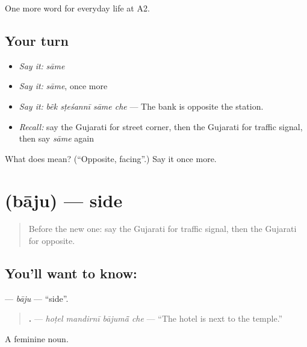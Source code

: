 \begin{grammarlens}[title={What you've built}]
One more word for everyday life at A2.
\end{grammarlens}

\subsection*{Your turn}
\begin{itemize}
\raggedright
  \item \emph{Say it:} \emph{sāme}
  \item \emph{Say it:} \emph{sāme}, once more
  \item \emph{Say it:} \emph{bẽk sṭeśannī sāme che} — The bank is opposite the station.
  \item \emph{Recall:} say the Gujarati for street corner, then the Gujarati for traffic signal, then say \emph{sāme} again
\end{itemize}

\begin{tcolorbox}[breakable,colback=teal!4,colframe=teal!35!black,title={Before you move on}]
What does  mean? (\textquotedblleft{}Opposite, facing\textquotedblright{}.) Say it once more.
\end{tcolorbox}
\section[\texorpdfstring{\gu{બાજુ} (bāju)}{બાજુ (bāju)}]{ (bāju) — side}

\label{lesson:GU-C194-baju}



\begin{quote}
Before the new one: say the Gujarati for traffic signal, then the Gujarati for opposite.
\end{quote}

\subsection*{You'll want to know: }
\textbf{} — \emph{bāju} — \textquotedblleft{}side\textquotedblright{}.

\begin{quote}
\textbf{   .} — \emph{hoṭel mandirnī bājumā̃ che} — \textquotedblleft{}The hotel is next to the temple.\textquotedblright{}
\end{quote}

A feminine noun.

